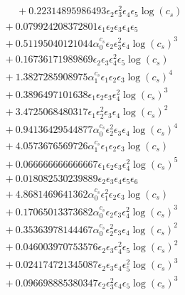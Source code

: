 \documentclass[10pt]{article}
\begin{document}
\begin{align*}
\phantom{F_{s,5}} &\phantom{={}}{}  + 0.22314895986493 \epsilon_{2} \epsilon_{3}^{2} \epsilon_{4} \epsilon_{5} \log{\left(c_{s} \right)} \\
&{}  + 0.079924208372801 \epsilon_{1} \epsilon_{2} \epsilon_{3} \epsilon_{4} \epsilon_{5} \\
&{}  + 0.51195040121044 \alpha_{0}^{c_s} \epsilon_{2} \epsilon_{3}^{2} \epsilon_{4} \log{\left(c_{s} \right)}^{3} \\
&{}  + 0.16736171989869 \epsilon_{2} \epsilon_{3} \epsilon_{4}^{2} \epsilon_{5} \log{\left(c_{s} \right)} \\
&{}  + 1.3827285908975 \alpha_{1}^{c_s} \epsilon_{1} \epsilon_{2} \epsilon_{3} \log{\left(c_{s} \right)}^{4} \\
&{}  + 0.3896497101638 \epsilon_{1} \epsilon_{2} \epsilon_{3} \epsilon_{4}^{2} \log{\left(c_{s} \right)}^{3} \\
&{}  + 3.4725068480317 \epsilon_{1} \epsilon_{2}^{2} \epsilon_{3} \epsilon_{4} \log{\left(c_{s} \right)}^{2} \\
&{}  + 0.94136429544877 \alpha_{0}^{c_s} \epsilon_{2}^{2} \epsilon_{3} \epsilon_{4} \log{\left(c_{s} \right)}^{4} \\
&{}  + 4.0573676569726 \alpha_{1}^{c_s} \epsilon_{1} \epsilon_{2} \epsilon_{3} \log{\left(c_{s} \right)} \\
&{}  + 0.066666666666667 \epsilon_{1} \epsilon_{2} \epsilon_{3} \epsilon_{4}^{2} \log{\left(c_{s} \right)}^{5} \\
&{}  + 0.018082530239889 \epsilon_{2} \epsilon_{3} \epsilon_{4} \epsilon_{5} \epsilon_{6} \\
&{}  + 4.8681469641362 \alpha_{0}^{c_s} \epsilon_{1}^{2} \epsilon_{2} \epsilon_{3} \log{\left(c_{s} \right)} \\
&{}  + 0.17065013373682 \alpha_{0}^{c_s} \epsilon_{2} \epsilon_{3} \epsilon_{4}^{2} \log{\left(c_{s} \right)}^{3} \\
&{}  + 0.35363978144467 \alpha_{0}^{c_s} \epsilon_{2}^{2} \epsilon_{3} \epsilon_{4} \log{\left(c_{s} \right)}^{2} \\
&{}  + 0.046003970753576 \epsilon_{2} \epsilon_{3} \epsilon_{4}^{2} \epsilon_{5} \log{\left(c_{s} \right)}^{2} \\
&{}  + 0.024174721345087 \epsilon_{2} \epsilon_{3} \epsilon_{4} \epsilon_{5}^{2} \log{\left(c_{s} \right)}^{3} \\
&{}  + 0.096698885380347 \epsilon_{2} \epsilon_{3}^{2} \epsilon_{4} \epsilon_{5} \log{\left(c_{s} \right)}^{3} \\

\end{align*}
\end{document}
